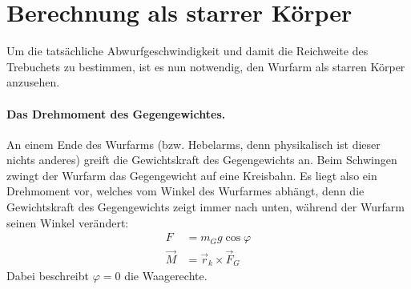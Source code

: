 \section{Berechnung als starrer Körper}
\label{starre-koerper}
Um die tatsächliche Abwurfgeschwindigkeit und damit die Reichweite des Trebuchets zu bestimmen, ist es nun notwendig, den Wurfarm als starren Körper anzusehen.

\paragraph{Das Drehmoment des Gegengewichtes.}
An einem Ende des Wurfarms (bzw. Hebelarms, denn physikalisch ist dieser nichts anderes) greift die Gewichtskraft des Gegengewichts an. Beim Schwingen zwingt der Wurfarm das Gegengewicht auf eine Kreisbahn. Es liegt also ein Drehmoment vor, welches vom Winkel des Wurfarmes abhängt, denn die Gewichtskraft des Gegengewichts zeigt immer nach unten, während der Wurfarm seinen Winkel verändert:
\begin{align}
F &= m_G g \cos{\varphi}\\
\label{drehmoment}
\vec M &=\vec r_k \times \vec F_G
\end{align}
Dabei beschreibt $\varphi=0$ die Waagerechte.

